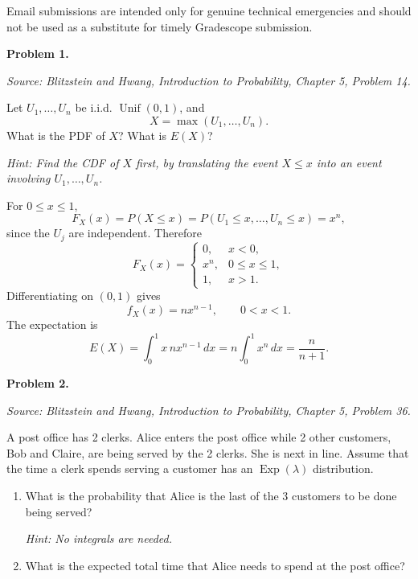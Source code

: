 \documentclass[11pt]{article}
\newcommand{\source}[2]{%
    \vspace{0.15cm}
    {\small\textit{Source: Blitzstein and Hwang, \textit{Introduction to Probability}, Chapter #1, Problem #2.}}
}
\begin{document}
Email submissions are intended only for genuine technical emergencies and should not be used as a substitute for timely Gradescope submission.

\newpage

 




\begin{problemheader}
\textbf{Problem 1.}
\end{problemheader}
\source{5}{14}

Let $U_1,\dots,U_n$ be i.i.d. $\operatorname{Unif}(0,1)$, and
\[
X=\max(U_1,\dots,U_n).
\]
What is the PDF of $X$? What is $E(X)$?

\emph{Hint: Find the CDF of $X$ first, by translating the event $X\le x$ into an event involving $U_1,\dots,U_n$.}

\begin{solutionbox}
For $0\le x\le1$,
\[
F_X(x)=P(X\le x)=P(U_1\le x,\dots,U_n\le x)=x^n,
\]
since the $U_j$ are independent. Therefore
\[
F_X(x)=
\begin{cases}
0, & x<0,\\
x^n, & 0\le x\le1,\\
1, & x>1.
\end{cases}
\]
Differentiating on $(0,1)$ gives
\[
f_X(x)=nx^{n-1}, \qquad 0<x<1.
\]
The expectation is
\[
E(X)=\int_0^1 x\,nx^{n-1}\,dx
=n\int_0^1 x^n\,dx
=\frac{n}{n+1}.
\]
 
\end{solutionbox}
\newpage

 
 
 


\begin{problemheader}
\textbf{Problem 2.}
\end{problemheader}
\source{5}{36}

A post office has 2 clerks. Alice enters the post office while 2 other customers, Bob and Claire, are being served by the 2 clerks. She is next in line. Assume that the time a clerk spends serving a customer has an $\operatorname{Exp}(\lambda)$ distribution.

\begin{enumerate}[label=(\alph*), leftmargin=*]
    \item What is the probability that Alice is the last of the 3 customers to be done being served?

    \emph{Hint: No integrals are needed.}

    \item What is the expected total time that Alice needs to spend at the post office?
\end{enumerate}
\end{document}
